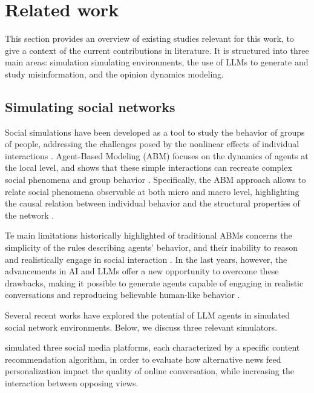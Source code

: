 \section{Related work}
\label{sec:relatedwork}

This section provides an overview of existing studies relevant for this work, to give a context of the current contributions in literature.
It is structured into three main areas: simulation simulating environments, the use of LLMs to generate and study misinformation, and the opinion dynamics modeling.

\subsection{Simulating social networks}

Social simulations have been developed as a tool to study the behavior of groups of people, addressing the challenges posed by the nonlinear effects of individual interactions \cite{squazzoni2014socialsimulation}.
Agent-Based Modeling (ABM) focuses on the dynamics of agents at the local level, and shows that these simple interactions can recreate complex social phenomena and group behavior \cite{macy2002abm}.
Specifically, the ABM approach allows to relate social phenomena observable at both micro and macro level, highlighting the causal relation between individual behavior and the structural properties of the network \cite{squazzoni2014socialsimulation}.

Te main limitations historically highlighted of traditional ABMs concerns the simplicity of the rules \cite{conte2014agent} describing agents' behavior, and their inability to reason and realistically engage in social interaction \cite{törnberg2023evaluate}.
In the last years, however, the advancements in AI and LLMs offer a new opportunity to overcome these drawbacks, making it possible to generate agents capable of engaging in realistic conversations and reproducing believable human-like behavior \cite{park2023genagents}.

Several recent works have explored the potential of LLM agents in simulated social network environments. Below, we discuss three relevant simulators.

\medskip
\citet{törnberg2023evaluate} simulated three social media platforms, each characterized by a specific content recommendation algorithm, in order to evaluate how alternative news feed personalization impact the quality of online conversation, while increasing the interaction between opposing views.

